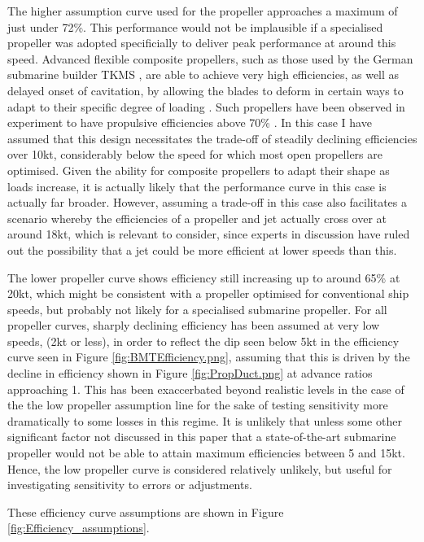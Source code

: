 \documentclass{article}\usepackage[]{graphicx}\usepackage[]{color}
\begin{document}
The higher assumption curve used for the propeller approaches a maximum of just under 72\%.  This performance would not be implausible if a specialised propeller was adopted specificially to deliver peak performance at around this speed. Advanced flexible composite propellers, such as those used by the German submarine builder TKMS \parencite{durrant2016}, are able to achieve very high efficiencies, as well as delayed onset of cavitation, by allowing the blades to deform in certain ways to adapt to their specific degree of loading \parencite{young2007hydroelastic2}.  Such propellers have been observed in experiment to have propulsive efficiencies above 70\% \parencite{young2007hydroelastic}.  In this case I have assumed that this design necessitates the trade-off of steadily declining efficiencies over 10kt, considerably below the speed for which most open propellers are optimised.  Given the ability for composite propellers to adapt their shape as loads increase, it is actually likely that the performance curve in this case is actually far broader. However, assuming a trade-off in this case also facilitates a scenario whereby the efficiencies of a propeller and jet actually cross over at around 18kt, which is relevant to consider, since experts in discussion have ruled out the possibility that a jet could be more efficient at lower speeds than this.

The lower propeller curve shows efficiency still increasing up to around 65\% at 20kt, which might be consistent with a propeller optimised for conventional ship speeds, but probably not likely for a specialised submarine propeller.  For all propeller curves, sharply declining efficiency has been assumed at very low speeds, (2kt or less), in order to reflect the dip seen below 5kt in the efficiency curve seen in Figure \ref{fig:BMTEfficiency.png}, assuming that this is driven by the decline in efficiency shown in Figure \ref{fig:PropDuct.png} at advance ratios approaching 1.  This has been exaccerbated beyond realistic levels in the case of the the low propeller assumption line for the sake of testing sensitivity more dramatically to some losses in this regime.  It is unlikely that unless some other significant factor not discussed in this paper that a state-of-the-art submarine propeller would not be able to attain maximum efficiencies between 5 and 15kt. Hence, the low propeller curve is considered relatively unlikely, but useful for investigating sensitivity to errors or adjustments.

These efficiency curve assumptions are shown in Figure \ref{fig:Efficiency_assumptions}.
\end{document}

